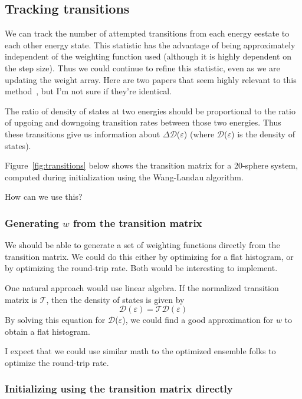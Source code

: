 \documentclass[letterpaper,twocolumn,amsmath,amssymb,pre,aps,10pt]{revtex4-1}
\begin{document}
\subsection{Tracking transitions}

We can track the number of attempted transitions from each energy
eestate to each other energy state.  This statistic has the advantage of
being approximately independent of the weighting function used
(although it is highly dependent on the step size).  Thus we could
continue to refine this statistic, even as we are updating the weight
array.  Here are two papers that seem highly relevant to this
method~\cite{wang1999transition, wang2002transition}, but I'm not sure
if they're identical.

The ratio of density of states at two energies should be proportional
to the ratio of upgoing and downgoing transition rates between those
two energies.  Thus these transitions give us information about
$\Delta$$\mathcal{D}$($\varepsilon$) (where $\mathcal{D}$($\varepsilon$) 
is the density of states).

Figure~\ref{fig:transitions} below shows the transition matrix for a
20-sphere system, computed during initialization using the Wang-Landau
algorithm.

How can we use this?

\subsubsection{Generating $w$ from the transition matrix}

We should be able to generate a set of weighting functions directly
from the transition matrix.  We could do this either by optimizing for
a flat histogram, or by optimizing the round-trip rate.  Both would be
interesting to implement.

One natural approach would use linear algebra.  If the normalized
transition matrix is $\mathcal{T}$, then the density of states is given by
\begin{equation}
  \mathcal{D}(\varepsilon) = \mathcal{T}\mathcal{D}(\varepsilon) 
\end{equation}
By solving this equation for $\mathcal{D}$($\varepsilon$), we could find a 
good approximation for $w$ to obtain a flat histogram.

I expect that we could use similar math to the optimized ensemble
folks to optimize the round-trip rate.

\subsubsection{Initializing using the transition matrix directly}
\end{document}
